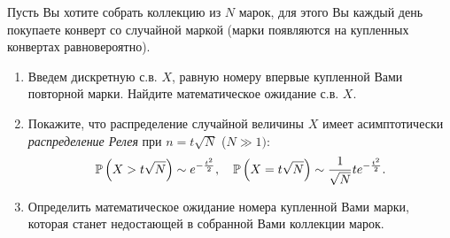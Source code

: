\begin{problem}
\label{laplas}
Пусть Вы хотите собрать коллекцию из $N$ 
марок, для этого Вы каждый день покупаете конверт со случайной маркой 
(марки появляются на купленных конвертах равновероятно).
\begin{enumerate}
\item Введем дискретную с.в. $X$, равную номеру впервые купленной Вами 
повторной марки. Найдите математическое ожидание с.в. $X$.

\item Покажите, что распределение случайной величины $X$ имеет асимптотически 
\textit{ распределение Релея } при $n=t\sqrt N $ ($N\gg 1)$:
$$ \mathrm{{\mathbb P}} \left ( {X>t\sqrt N } \right ) \sim e^{-\frac{t^2}{2}},
\quad \mathrm{{\mathbb P}}\left ( {X=t\sqrt N } \right ) \sim \frac{1}{\sqrt N }te^{-\frac{t^2}{2}}.$$
\item Определить математическое ожидание номера купленной Вами марки, которая 
станет недостающей в собранной Вами коллекции марок. 
\end{enumerate}
\end{problem}


